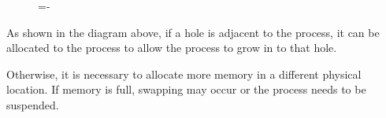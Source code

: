\documentclass[a4paper]{systems-software}
\begin{document}
\begin{figure}[H]
  \lineskip=-\fboxrule
\end{figure}

As shown in the diagram above, if a hole is adjacent to the process, it can be allocated to the process to allow the process to grow in to that hole.

Otherwise, it is necessary to allocate more memory in a different physical location. If memory is full, swapping may occur or the process needs to be suspended.
\end{document}
